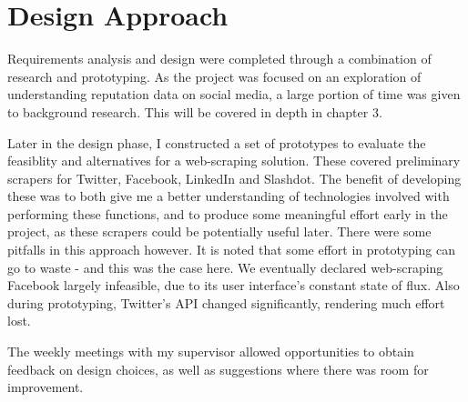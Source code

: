 



\section{Design Approach}

Requirements analysis and design were completed through a combination of research and prototyping. As the project was focused on an exploration of understanding reputation data on social media, a large portion of time was given to background research. This will be covered in depth in chapter 3.

Later in the design phase, I constructed a set of prototypes to evaluate the feasiblity and alternatives for a web-scraping solution. These covered preliminary scrapers for Twitter, Facebook, LinkedIn and Slashdot. The benefit of developing these was to both give me a better understanding of technologies involved with performing these functions, and to produce some meaningful effort early in the project, as these scrapers could be potentially useful later. There were some pitfalls in this approach however. It is noted that some effort in prototyping can go to waste - and this was the case here. We eventually declared web-scraping Facebook largely infeasible, due to its user interface's constant state of flux. Also during prototyping, Twitter's API changed significantly, rendering much effort lost. 

The weekly meetings with my supervisor allowed opportunities to obtain feedback on design choices, as well as suggestions where there was room for improvement. 





